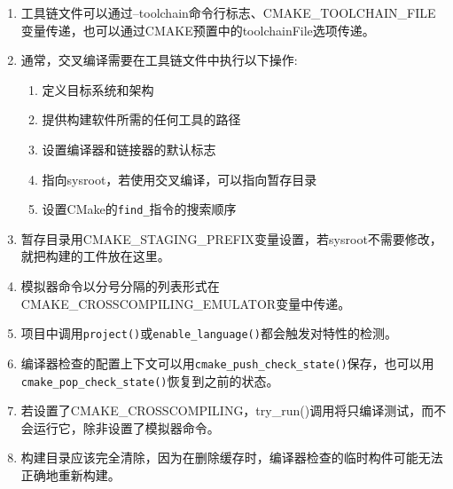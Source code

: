 

\begin{enumerate}
\item 
工具链文件可以通过--toolchain命令行标志、CMAKE\_TOOLCHAIN\_FILE变量传递，也可以通过CMAKE预置中的toolchainFile选项传递。

\item
通常，交叉编译需要在工具链文件中执行以下操作:

\begin{enumerate}[label=\Alph*]
\item
定义目标系统和架构
 
\item 
提供构建软件所需的任何工具的路径

\item 
设置编译器和链接器的默认标志

\item 
指向sysroot，若使用交叉编译，可以指向暂存目录

\item 
设置CMake的\texttt{find\_}指令的搜索顺序
\end{enumerate}

\item 
暂存目录用CMAKE\_STAGING\_PREFIX变量设置，若sysroot不需要修改，就把构建的工件放在这里。

\item 
模拟器命令以分号分隔的列表形式在CMAKE\_CROSSCOMPILING\_EMULATOR变量中传递。

\item 
项目中调用\texttt{project()}或\texttt{enable\_language()}都会触发对特性的检测。

\item 
编译器检查的配置上下文可以用\texttt{cmake\_push\_check\_state()}保存，也可以用\texttt{cmake\_pop\_check\_state()}恢复到之前的状态。

\item 
若设置了CMAKE\_CROSSCOMPILING，try\_run()调用将只编译测试，而不会运行它，除非设置了模拟器命令。

\item 
构建目录应该完全清除，因为在删除缓存时，编译器检查的临时构件可能无法正确地重新构建。
\end{enumerate}